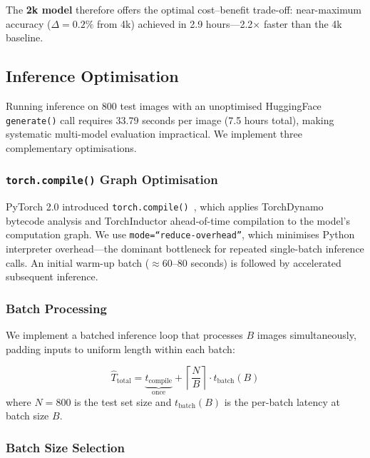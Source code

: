 \documentclass[twocolumn]{article}
\begin{document}
The \textbf{2k model} therefore offers the optimal cost--benefit trade-off:
near-maximum accuracy ($\Delta = 0.2\%$ from 4k) achieved in 2.9 hours---2.2$\times$
faster than the 4k baseline.

\subsection{Inference Optimisation}
\label{sec:inference}

Running inference on 800 test images with an unoptimised HuggingFace
\texttt{generate()} call requires 33.79 seconds per image (7.5 hours total),
making systematic multi-model evaluation impractical. We implement three
complementary optimisations.

\subsubsection{\texttt{torch.compile()} Graph Optimisation}

PyTorch 2.0 introduced \texttt{torch.compile()}~\cite{pytorch2023compile},
which applies TorchDynamo bytecode analysis and TorchInductor ahead-of-time
compilation to the model's computation graph.
We use \texttt{mode=\textrm{``}reduce-overhead\textrm{''}}, which
minimises Python interpreter overhead---the dominant bottleneck for repeated
single-batch inference calls.
An initial warm-up batch ($\approx$60--80 seconds) is followed by accelerated
subsequent inference.

\subsubsection{Batch Processing}

We implement a batched inference loop that processes $B$ images simultaneously,
padding inputs to uniform length within each batch:

\begin{equation}
  \hat{T}_{\text{total}} = \underbrace{t_{\text{compile}}}_{\text{once}} +
  \left\lceil \frac{N}{B} \right\rceil \cdot t_{\text{batch}}(B)
  \label{eq:batch_time}
\end{equation}
where $N = 800$ is the test set size and $t_{\text{batch}}(B)$ is the
per-batch latency at batch size $B$.

\subsubsection{Batch Size Selection}
\end{document}
